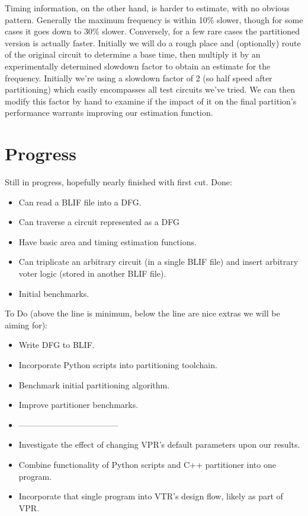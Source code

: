\documentclass[12pt,drafta4paper,oneside]{memoir} %
\begin{document}
{Timing information, on the other hand, is harder to estimate, with no obvious pattern. Generally the maximum frequency is within 10\% slower, though for some cases it goes down to 30\% slower. Conversely, for a few rare cases the partitioned version is actually faster. Initially we will do a rough place and (optionally) route of the original circuit to determine a base time, then multiply it by an experimentally determined slowdown factor to obtain an estimate for the frequency. Initially we're using a slowdown factor of 2 (so half speed after partitioning) which easily encompasses all test circuits we've tried. We can then modify this factor by hand to examine if the impact of it on the final partition's performance warrants improving our estimation function.


\section{Progress}
Still in progress, hopefully nearly finished with first cut.
Done:
\begin{itemize}
    \item Can read a \ac{BLIF} file into a \ac{DFG}.
    \item Can traverse a circuit represented as a \ac{DFG}
    \item Have basic area and timing estimation functions.
    \item Can triplicate an arbitrary circuit (in a single \ac{BLIF} file) and insert arbitrary voter logic (stored in another \ac{BLIF} file).
    \item Initial benchmarks.
\end{itemize}
To Do (above the line is minimum, below the line are nice extras we will be aiming for):
\begin{itemize}
    \item Write \ac{DFG} to \ac{BLIF}.
    \item Incorporate Python scripts into partitioning toolchain.
    \item Benchmark initial partitioning algorithm.
    \item Improve partitioner benchmarks.
    \item ------------------------------------
    \item Investigate the effect of changing \ac{VPR}'s default parameters upon our results.
    \item Combine functionality of Python scripts and C++ partitioner into one program.
    \item Incorporate that single program into \ac{VTR}'s design flow, likely as part of \ac{VPR}.
\end{itemize}
}
\end{document}

